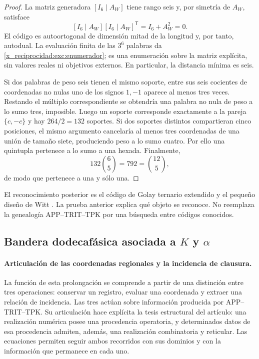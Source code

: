 \begin{proof}
La matriz generadora $[I_6\mid A_W]$ tiene rango seis y, por simetría
de $A_W$, satisface
\[
 [I_6\mid A_W][I_6\mid A_W]^{\mathsf T}
   =I_6+A_W^2=0.
\]
El código es autoortogonal de dimensión mitad de la longitud y, por
tanto, autodual. La evaluación finita de las $3^6$ palabras da
\eqref{x_reciprocidad:exc:enumerador}; es una enumeración sobre la matriz explícita,
sin valores reales ni objetivos externos. En particular, la distancia
mínima es seis.

Si dos palabras de peso seis tienen el mismo soporte, entre sus seis
cocientes de coordenadas no nulas uno de los signos $1,-1$ aparece al
menos tres veces. Restando el múltiplo correspondiente se obtendría
una palabra no nula de peso a lo sumo tres, imposible. Luego un soporte
corresponde exactamente a la pareja $\{c,-c\}$ y hay $264/2=132$
soportes. Si dos soportes distintos compartieran cinco posiciones,
el mismo argumento cancelaría al menos tres coordenadas de una unión
de tamaño siete, produciendo peso a lo sumo cuatro. Por ello una
quintupla pertenece a lo sumo a una hexada. Finalmente,
\[
 132\binom65=792=\binom{12}5,
\]
de modo que pertenece a una y sólo una.
\end{proof}

El reconocimiento posterior es el código de Golay ternario extendido y
el pequeño diseño de Witt \cite{x_reciprocidad:conwaysloane}. La prueba anterior explica qué objeto se
reconoce. No reemplaza la genealogía APP--TRIT--TPK por una búsqueda
entre códigos conocidos.

\subsection{Bandera dodecafásica asociada a \texorpdfstring{$K$ y $\alpha$}{K y alfa}}
\label{x_reciprocidad:exc:bandera}


\paragraph{Articulación de las coordenadas regionales y la incidencia de clausura.}
\label{x_reciprocidad:inc-ampl-articulacion}
La función de esta prolongación se comprende a partir de una distinción
entre tres operaciones: conservar un registro, evaluar una coordenada y
extraer una relación de incidencia. Las tres actúan sobre información
producida por APP--TRIT--TPK. Su articulación hace explícita la tesis
estructural del artículo: una realización numérica posee una procedencia
operatoria, y determinados datos de esa procedencia admiten, además, una
realización combinatoria y reticular. Las ecuaciones permiten seguir ambos
recorridos con sus dominios y con la información que permanece en cada uno.

